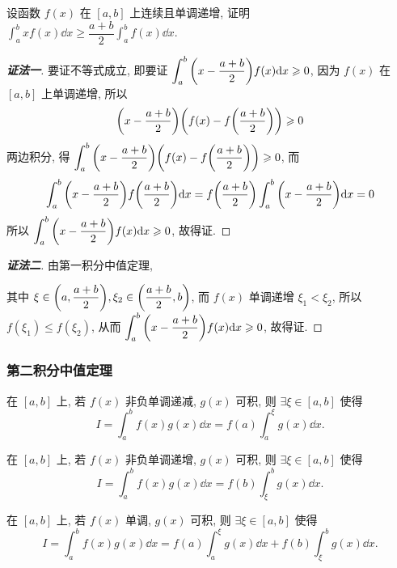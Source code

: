 \begin{example}
    设函数 $f(x)$ 在 $[a,b]$ 上连续且单调递增, 证明 $\displaystyle\int_{a}^{b}xf(x)\dd x\geqslant \dfrac{a+b}{2}\int_{a}^{b}f(x)\dd x.$
    \label{intabxfxdx}
\end{example}
\begin{proof}[{\songti \textbf{证法一}}]
    要证不等式成立, 即要证 $\displaystyle\int_{a}^{b}\qty(x-\dfrac{a+b}{2})f(x)\dd x\geqslant 0$, 因为 $f(x)$ 在 $[a,b]$ 上单调递增,
    所以
    $$\displaystyle \qty(x-\dfrac{a+b}{2})\qty(f(x)-f\qty(\dfrac{a+b}{2}))\geqslant 0$$
    两边积分, 得
    $\displaystyle \int_{a}^{b}\qty(x-\dfrac{a+b}{2})\qty(f(x)-f\qty(\dfrac{a+b}{2}))\geqslant 0$,
    而 $$\displaystyle\int_{a}^{b}\qty(x-\dfrac{a+b}{2})f\qty(\dfrac{a+b}{2})\dd x=f\qty(\dfrac{a+b}{2})\int_{a}^{b}\qty(x-\dfrac{a+b}{2})\dd x=0$$
    所以 $\displaystyle\int_{a}^{b}\qty(x-\dfrac{a+b}{2})f(x)\dd x\geqslant 0$, 故得证.
\end{proof}
\begin{proof}[{\songti \textbf{证法二}}]
    由第一积分中值定理,
    其中 $\xi\in\qty(a,\dfrac{a+b}{2}),\xi_2\in\qty(\dfrac{a+b}{2},b)$, 而 $f(x)$ 单调递增 $\xi_1<\xi_2$, 所以 $f(\xi_1)\leqslant f(\xi_2)$, 从而 $\displaystyle \int_{a}^{b}\qty(x-\dfrac{a+b}{2})f(x)\dd x\geqslant 0$, 故得证.
\end{proof}

\subsubsection{第二积分中值定理}

\begin{theorem}[第二积分中值定理 A]
    在 $ [a, b] $ 上, 若 $ f(x) $ 非负单调递减, $g(x) $ 可积, 则 $ \exists \xi \in[a, b] $ 使得
    $$I=\int_{a}^{b} f(x) g(x) \dd  x=f(a) \int_{a}^{\xi} g(x) \dd  x.$$
\end{theorem}
\begin{theorem}[第二积分中值定理 B]
    在 $ [a, b] $ 上, 若 $ f(x) $ 非负单调递增, $g(x) $ 可积, 则 $ \exists \xi \in[a, b] $ 使得
    $$I=\int_{a}^{b} f(x) g(x) \dd  x=f(b) \int_{\xi}^{b} g(x) \dd  x.$$
\end{theorem}
\begin{theorem}[第二积分中值定理 C]
    在 $ [a, b] $ 上, 若 $ f(x) $ 单调, $g(x) $ 可积, 则 $ \exists \xi \in[a, b] $ 使得
    $$I=\int_{a}^{b} f(x) g(x) \dd  x=f(a) \int_{a}^{\xi} g(x) \dd  x+f(b) \int_{\xi}^{b} g(x) \dd  x .$$
\end{theorem}

